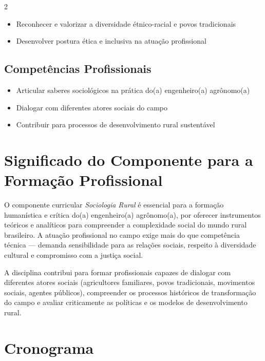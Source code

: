 \documentclass[11pt,a4paper]{article}
\begin{document}
\begin{multicols}{2}
\begin{itemize}
\item Reconhecer e valorizar a diversidade étnico-racial e povos tradicionais

\item Desenvolver postura ética e inclusiva na atuação profissional

\end{itemize}

\subsection*{Competências Profissionais}

\begin{itemize}

\item Articular saberes sociológicos na prática do(a) engenheiro(a) agrônomo(a)

\item Dialogar com diferentes atores sociais do campo

\item Contribuir para processos de desenvolvimento rural sustentável

\end{itemize}

\end{multicols}

\section*{Significado do Componente para a Formação Profissional}

O componente curricular \textit{Sociologia Rural} é essencial para a formação humanística e crítica do(a) engenheiro(a) agrônomo(a), por oferecer instrumentos teóricos e analíticos para compreender a complexidade social do mundo rural brasileiro. A atuação profissional no campo exige mais do que competência técnica --- demanda sensibilidade para as relações sociais, respeito à diversidade cultural e compromisso com a justiça social.

A disciplina contribui para formar profissionais capazes de dialogar com diferentes atores sociais (agricultores familiares, povos tradicionais, movimentos sociais, agentes públicos), compreender os processos históricos de transformação do campo e avaliar criticamente as políticas e os modelos de desenvolvimento rural.

\section*{Cronograma}
\end{document}
